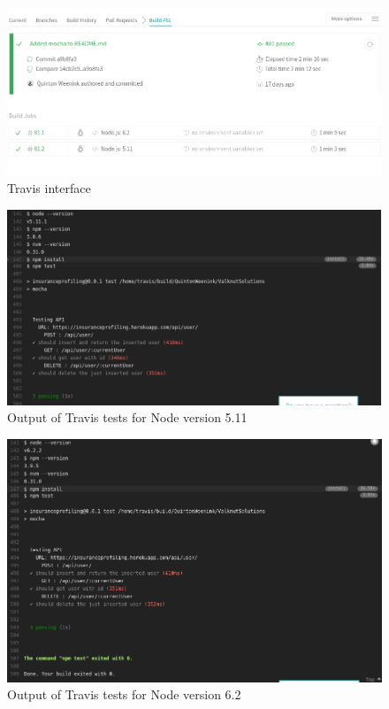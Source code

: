 \documentclass{article}
\begin{document}
\begin{figure}[h]
  \centering
      \includegraphics[width=\textwidth]{images/TravisInterface.png}
  \caption{Travis interface}
\end{figure}

\begin{figure}[h]
  \centering
      \includegraphics[width=\textwidth]{images/5_11.png}
  \caption{Output of Travis tests for Node version 5.11}
  \label{fig:5_11}
\end{figure}

\begin{figure}[h]
  \centering
      \includegraphics[width=\textwidth]{images/6_2.png}
  \caption{Output of Travis tests for Node version 6.2}
  \label{fig:6_2}
\end{figure}
\end{document}
